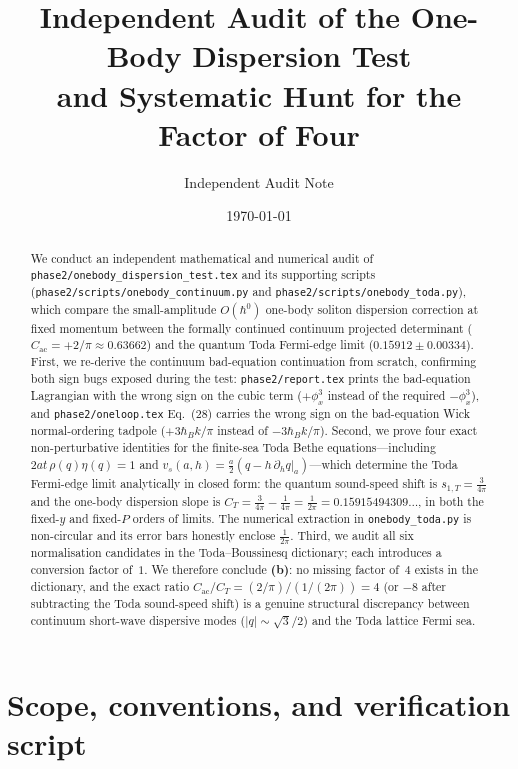 \documentclass[11pt,a4paper]{article}
\title{Independent Audit of the One-Body Dispersion Test\\
and Systematic Hunt for the Factor of Four}
\author{Independent Audit Note}
\date{\today}
\begin{document}
\maketitle

\begin{abstract}
We conduct an independent mathematical and numerical audit of
\texttt{phase2/onebody\_dispersion\_test.tex} and its supporting scripts
(\texttt{phase2/scripts/onebody\_continuum.py} and \texttt{phase2/scripts/onebody\_toda.py}),
which compare the small-amplitude $O(\hbar^0)$ one-body soliton dispersion correction
at fixed momentum between the formally continued continuum projected determinant
($C_{\mathrm{ac}} = +2/\pi \approx 0.63662$) and the quantum Toda Fermi-edge limit
($0.15912 \pm 0.00334$).
First, we re-derive the continuum bad-equation continuation from scratch, confirming both
sign bugs exposed during the test: \texttt{phase2/report.tex} prints the bad-equation
Lagrangian with the wrong sign on the cubic term ($+\phi_x^3$ instead of the required $-\phi_x^3$),
and \texttt{phase2/oneloop.tex} Eq.~(28) carries the wrong sign on the bad-equation Wick
normal-ordering tadpole ($+3\hbar_B k/\pi$ instead of $-3\hbar_B k/\pi$).
Second, we prove four exact non-perturbative identities for the finite-sea Toda Bethe
equations---including $2at\,\rho(q)\eta(q)=1$ and $v_s(a,h) = \frac{a}{2}(q - h\,\partial_h q|_a)$---which
determine the Toda Fermi-edge limit analytically in closed form:
the quantum sound-speed shift is $s_{1,T} = \frac{3}{4\pi}$ and the one-body dispersion slope is
$C_T = \frac{3}{4\pi} - \frac{1}{4\pi} = \frac{1}{2\pi} = 0.15915494309\dots$, in both the
fixed-$y$ and fixed-$P$ orders of limits. The numerical extraction in \texttt{onebody\_toda.py}
is non-circular and its error bars honestly enclose $\frac{1}{2\pi}$.
Third, we audit all six normalisation candidates in the Toda--Boussinesq dictionary; each
introduces a conversion factor of~$1$. We therefore conclude \textbf{(b)}: no missing factor
of~$4$ exists in the dictionary, and the exact ratio $C_{\mathrm{ac}}/C_T = (2/\pi)/(1/(2\pi)) = 4$
(or $-8$ after subtracting the Toda sound-speed shift) is a genuine structural discrepancy
between continuum short-wave dispersive modes ($|q|\sim \sqrt{3}/2$) and the Toda lattice Fermi sea.
\end{abstract}

\section{Scope, conventions, and verification script}
\end{document}
